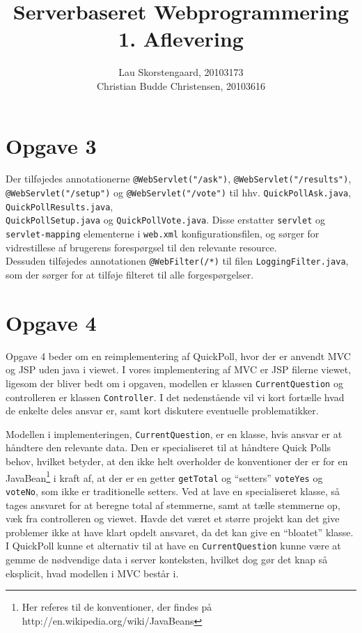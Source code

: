 \documentclass[a4paper,10pt]{article}
\author{Lau Skorstengaard, 20103173 \\Christian Budde Christensen, 20103616}
\title{Serverbaseret Webprogrammering\\1. Aflevering}
\begin{document}
\maketitle
\section*{Opgave 3}
Der tilføjedes annotationerne \texttt{@WebServlet("\//ask")}, \texttt{@WebServlet("\//results")}, \texttt{@WebServlet("\//setup")} og \texttt{@WebServlet("\//vote")} til hhv. \texttt{QuickPollAsk.java}, \texttt{QuickPollResults.java}, \\ \texttt{QuickPollSetup.java} og \texttt{QuickPollVote.java}. Disse erstatter \texttt{servlet} og \texttt{servlet-mapping} elementerne i \texttt{web.xml} konfigurationsfilen, og sørger for vidrestillese af brugerens forespørgsel til den relevante resource. \\
Dessuden tilføjedes annotationen \texttt{@WebFilter(/*)} til filen \texttt{LoggingFilter.java}, som der sørger for at tilføje filteret til alle forgespørgelser.\\

\section*{Opgave 4}
Opgave 4 beder om en reimplementering af QuickPoll, hvor der er anvendt MVC og JSP uden java i viewet. I vores implementering af MVC er JSP filerne viewet, ligesom der bliver bedt om i opgaven, modellen er klassen \texttt{CurrentQuestion} og controlleren er klassen \texttt{Controller}. I det nedenstående vil vi kort fortælle hvad de enkelte deles ansvar er, samt kort diskutere eventuelle problematikker.

Modellen i implementeringen, \texttt{CurrentQuestion}, er en klasse, hvis ansvar er at håndtere den relevante data. Den er specialiseret til at håndtere Quick Polls behov, hvilket betyder, at den ikke helt overholder de konventioner der er for en JavaBean\footnote{Her referes til de konventioner, der findes på http://en.wikipedia.org/wiki/JavaBeans} i kraft af, at der er en getter \texttt{getTotal} og ``setters'' \texttt{voteYes} og \texttt{voteNo}, som ikke er traditionelle setters. Ved at lave en specialiseret klasse, så tages ansvaret for at beregne total af stemmerne, samt at tælle stemmerne op, væk fra controlleren og viewet. Havde det været et større projekt kan det give problemer ikke at have klart opdelt ansvaret, da det kan give en ``bloatet'' klasse. I QuickPoll kunne et alternativ til at have en \texttt{CurrentQuestion} kunne være at gemme de nødvendige data i server konteksten, hvilket dog gør det knap så eksplicit, hvad modellen i MVC består i.
\end{document}

